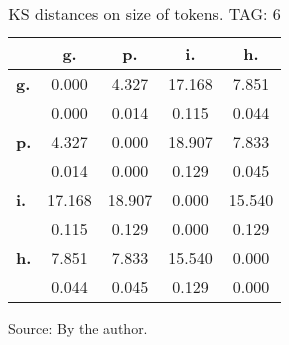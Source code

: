 \begin{table}[h!]
\begin{center}
\caption{KS distances on size of tokens. TAG: 6}
	\label{tab:kolTok}
\begin{tabular}{| l || c | c | c | c |}\hline
 & {\bf g.} & {\bf p.} & {\bf i.} & {\bf h.} \\\hline\hline
{\bf g.} & 0.000 & 4.327 & 17.168 & 7.851 \\
{\bf } & 0.000 & 0.014 & 0.115 & 0.044 \\\hline
{\bf p.} & 4.327 & 0.000 & 18.907 & 7.833 \\
{\bf } & 0.014 & 0.000 & 0.129 & 0.045 \\\hline
{\bf i.} & 17.168 & 18.907 & 0.000 & 15.540 \\
{\bf } & 0.115 & 0.129 & 0.000 & 0.129 \\\hline
{\bf h.} & 7.851 & 7.833 & 15.540 & 0.000 \\
{\bf } & 0.044 & 0.045 & 0.129 & 0.000 \\\hline
\end{tabular}
\begin{flushleft}\footnotesize
		Source: By the author.\
\end{flushleft}
\end{center}
\end{table}
